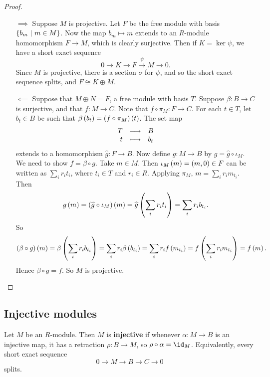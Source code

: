 \begin{proof}
\hfill
\begin{itemize}
\item[$ \implies $] Suppose $ M $ is projective. Let $ F $ be the free module with basis $ \cbr{b_m \st m \in M} $. Now the map $ b_m \mapsto m $ extends to an $ R $-module homomorphism $ F \to M $, which is clearly surjective. Then if $ K = \ker \psi $, we have a short exact sequence
$$ 0 \to K \to F \xrightarrow{\psi} M \to 0. $$
Since $ M $ is projective, there is a section $ \sigma $ for $ \psi $, and so the short exact sequence splits, and $ F \cong K \oplus M $.


\item[$ \impliedby $] Suppose that $ M \oplus N = F $, a free module with basis $ T $. Suppose $ \beta : B \to C $ is surjective, and that $ f : M \to C $. Note that $ f \circ \pi_M : F \to C $. For each $ t \in T $, let $ b_t \in B $ be such that $ \beta\br{b_t} = \br{f \circ \pi_M}\br{t} $. The set map
$$ \function{T}{B}{t}{b_t} $$
extends to a homomorphism $ \widehat{g} : F \to B $. Now define $ g : M \to B $ by $ g = \widehat{g} \circ \iota_M $. We need to show $ f = \beta \circ g $. Take $ m \in M $. Then $ \iota_M\br{m} = \br{m, 0} \in F $ can be written as $ \sum_i r_it_i $, where $ t_i \in T $ and $ r_i \in R $. Applying $ \pi_M $, $ m = \sum_i r_im_{t_i} $. Then
$$ g\br{m} = \br{\widehat{g} \circ \iota_M}\br{m} = \widehat{g}\br{\sum_i r_it_i} = \sum_i r_ib_{t_i}. $$
So
$$ \br{\beta \circ g}\br{m} = \beta\br{\sum_i r_ib_{t_i}} = \sum_i r_i\beta\br{b_{t_i}} = \sum_i r_if\br{m_{t_i}} = f\br{\sum_i r_im_{t_i}} = f\br{m}. $$
Hence $ \beta \circ g = f $. So $ M $ is projective.
\end{itemize}
\end{proof}

\pagebreak

\subsection{Injective modules}

\begin{definition}
Let $ M $ be an $ R $-module. Then $ M $ is \textbf{injective} if whenever $ \alpha : M \to B $ is an injective map, it has a retraction $ \rho : B \to M $, so $ \rho \circ \alpha = \id_M $. Equivalently, every short exact sequence
$$ 0 \to M \to B \to C \to 0 $$
splits.
\end{definition}

